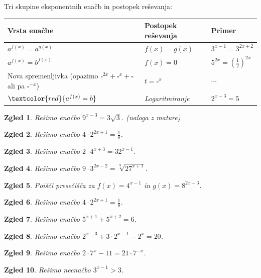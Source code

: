 \documentclass{article}
\newtheorem*{zgled}{Zgled}
\begin{document}
Tri skupine eksponentnih enačb in postopek reševanja:\\
\begin{tabular}{|l|l|l|}
\hline
Vrsta enačbe           & Postopek reševanja &Primer                      \\ \hline
$a^{f(x)}=a^{g(x)}$             & $f(x)=g(x)$  &$3^{x-1}=3^{2x+2}$                            \\
$a^{f(x)}=b^{f(x)}$             & $f(x)=0$    &$5^{2x}=(\frac{1}{2})^{2x}$                          \\
Nova spremenljivka (opazimo $\square^{2x} + \square^x+\square$ ali pa $\square^{-x}$)             & $t=\square^x$    &$\cdots$        \\
$\textcolor{red}{a^{f(x)}=b}$ & \textit{Logaritmiranje}&$2^{x-3}=5$\\\hline
\end{tabular}

\begin{zgled}
    Rešimo enačbo $9^{x-3}=3\sqrt{3}$. (naloga z mature)
\end{zgled}
\begin{zgled}
    Rešimo enačbo $4\cdot 2^{2x+1}=\frac{1}{8}$.
\end{zgled}
\begin{zgled}
    Rešimo enačbo $2\cdot 4^{x+3}=32^{x-1}$.
\end{zgled}
\begin{zgled}
    Rešimo enačbo $9\cdot 3^{2x-2}=\sqrt[9]{27^{x+1}}$.
\end{zgled}
\begin{zgled}
    Poišči presečišča za $f(x)=4^{x-1}$ in $g(x)=8^{2x-3}$.
\end{zgled}
\begin{zgled}
    Rešimo enačbo $4\cdot 2^{2x+1}=\frac{1}{8}$.
\end{zgled}
\begin{zgled}
    Rešimo enačbo $5^{x+1}+5^{x+2}=6$.
\end{zgled}
\begin{zgled}
    Rešimo enačbo $2^{x-3}+3\cdot 2^{x-1}-2^x=20$.
\end{zgled}

\begin{zgled}
    Rešimo enačbo $2\cdot 7^x-11=21\cdot 7^{-x}$.
\end{zgled}
\begin{zgled}
    Rešimo neenačbo $3^{x-1}>3$.
\end{zgled}
\end{document}
